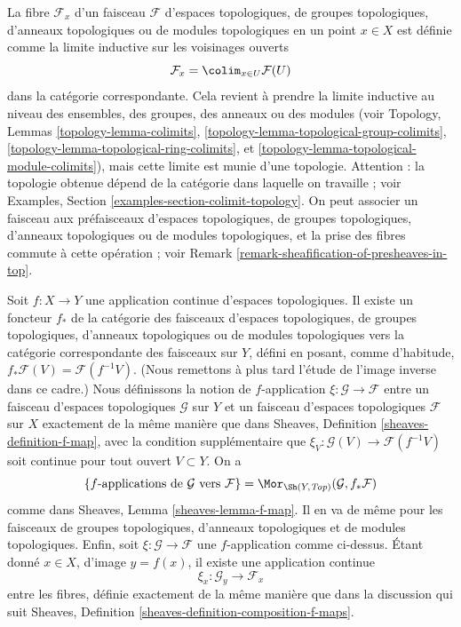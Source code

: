 \medskip\noindent
La fibre $\mathcal{F}_x$ d'un faisceau $\mathcal{F}$
d'espaces topologiques, de groupes topologiques, d'anneaux topologiques ou de
modules topologiques en un point $x \in X$ est définie comme la limite inductive sur les
voisinages ouverts
$$
\mathcal{F}_x = \colim_{x\in U} \mathcal{F}(U)
$$
dans la catégorie correspondante. Cela revient à prendre
la limite inductive au niveau des ensembles, des groupes, des anneaux ou des modules
(voir Topology, Lemmas \ref{topology-lemma-colimits},
\ref{topology-lemma-topological-group-colimits},
\ref{topology-lemma-topological-ring-colimits}, et
\ref{topology-lemma-topological-module-colimits}),
mais cette limite est munie d'une topologie. Attention :
la topologie obtenue dépend de la catégorie dans laquelle on travaille ; voir
Examples, Section \ref{examples-section-colimit-topology}.
On peut associer un faisceau aux préfaisceaux d'espaces topologiques,
de groupes topologiques, d'anneaux topologiques ou de modules topologiques,
et la prise des fibres commute à cette opération ; voir
Remark \ref{remark-sheafification-of-presheaves-in-top}.

\medskip\noindent
Soit $f : X \to Y$ une application continue d'espaces topologiques.
Il existe un foncteur $f_*$ de la catégorie des faisceaux d'espaces
topologiques, de groupes topologiques, d'anneaux topologiques ou de modules topologiques
vers la catégorie correspondante des faisceaux sur $Y$, défini en posant, comme d'habitude,
$f_*\mathcal{F}(V) = \mathcal{F}(f^{-1}V)$.
(Nous remettons à plus tard l'étude de l'image inverse dans ce cadre.)
Nous définissons la notion de $f$-application $\xi : \mathcal{G} \to \mathcal{F}$
entre un faisceau d'espaces topologiques $\mathcal{G}$ sur $Y$ et
un faisceau d'espaces topologiques $\mathcal{F}$ sur $X$ exactement de la
même manière que dans Sheaves, Definition \ref{sheaves-definition-f-map},
avec la condition supplémentaire que
$\xi_V : \mathcal{G}(V) \to \mathcal{F}(f^{-1}V)$ soit continue
pour tout ouvert $V \subset Y$. On a
$$
\{f\text{-applications de }\mathcal{G}\text{ vers }\mathcal{F}\} =
\Mor_{\Sh(Y, \textit{Top})}(\mathcal{G}, f_*\mathcal{F})
$$
comme dans Sheaves, Lemma \ref{sheaves-lemma-f-map}. Il en va de même pour les
faisceaux de groupes topologiques, d'anneaux topologiques et de modules topologiques. Enfin,
soit $\xi : \mathcal{G} \to \mathcal{F}$ une $f$-application comme ci-dessus.
Étant donné $x \in X$, d'image $y = f(x)$, il existe une application
continue
$$
\xi_x : \mathcal{G}_y \longrightarrow \mathcal{F}_x
$$
entre les fibres, définie exactement de la même manière que dans la discussion
qui suit Sheaves, Definition \ref{sheaves-definition-composition-f-maps}.

